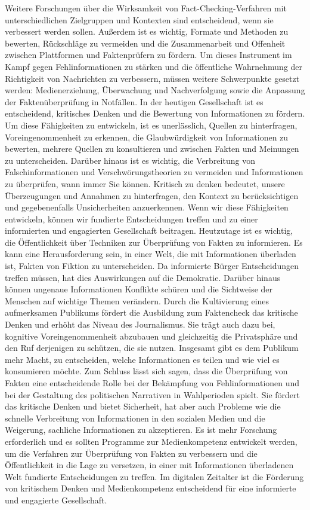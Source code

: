 \documentclass[a4paper,listof=totoc,bibliography=totoc]{scrartcl}
\begin{document}
Weitere Forschungen über die Wirksamkeit von Fact-Checking-Verfahren mit unterschiedlichen Zielgruppen und Kontexten sind entscheidend, wenn sie verbessert werden 
sollen. Außerdem ist es wichtig, Formate und Methoden zu bewerten, Rückschläge zu vermeiden und die Zusammenarbeit und Offenheit zwischen Plattformen und Faktenprüfern 
zu fördern. Um dieses Instrument im Kampf gegen Fehlinformationen zu stärken und die öffentliche Wahrnehmung der Richtigkeit von Nachrichten zu verbessern, müssen 
weitere Schwerpunkte gesetzt werden: Medienerziehung, Überwachung und Nachverfolgung sowie die Anpassung der Faktenüberprüfung in Notfällen. 
In der heutigen Gesellschaft ist es entscheidend, kritisches Denken und die Bewertung von Informationen zu fördern. Um diese Fähigkeiten zu entwickeln, ist es unerlässlich, 
Quellen zu hinterfragen, Voreingenommenheit zu erkennen, die Glaubwürdigkeit von Informationen zu bewerten, mehrere Quellen zu konsultieren und zwischen Fakten und 
Meinungen zu unterscheiden. Darüber hinaus ist es wichtig, die Verbreitung von Falschinformationen und Verschwörungstheorien zu vermeiden und Informationen zu überprüfen, 
wann immer Sie können. Kritisch zu denken bedeutet, unsere Überzeugungen und Annahmen zu hinterfragen, den Kontext zu berücksichtigen und gegebenenfalls Unsicherheiten 
anzuerkennen. Wenn wir diese Fähigkeiten entwickeln, können wir fundierte Entscheidungen treffen und zu einer informierten und engagierten Gesellschaft beitragen. 
Heutzutage ist es wichtig, die Öffentlichkeit über Techniken zur Überprüfung von Fakten zu informieren. Es kann eine Herausforderung sein, in einer Welt, die mit Informationen 
überladen ist, Fakten von Fiktion zu unterscheiden. Da informierte Bürger Entscheidungen treffen müssen, hat dies Auswirkungen auf die Demokratie. Darüber hinaus können 
ungenaue Informationen Konflikte schüren und die Sichtweise der Menschen auf wichtige Themen verändern. Durch die Kultivierung eines aufmerksamen Publikums fördert die Ausbildung 
zum Faktencheck das kritische Denken und erhöht das Niveau des Journalismus. Sie trägt auch dazu bei, kognitive Voreingenommenheit abzubauen und gleichzeitig die Privatsphäre 
und den Ruf derjenigen zu schützen, die sie nutzen. Insgesamt gibt es dem Publikum mehr Macht, zu entscheiden, welche Informationen es teilen und wie viel es konsumieren möchte. 
Zum Schluss lässt sich sagen, dass die Überprüfung von Fakten eine entscheidende Rolle bei der Bekämpfung von Fehlinformationen und bei der Gestaltung des politischen 
Narrativen in Wahlperioden spielt. Sie fördert das kritische Denken und bietet Sicherheit, hat aber auch Probleme wie die schnelle Verbreitung von Informationen in den 
sozialen Medien und die Weigerung, sachliche Informationen zu akzeptieren. Es ist mehr Forschung erforderlich und es sollten Programme zur Medienkompetenz entwickelt werden, 
um die Verfahren zur Überprüfung von Fakten zu verbessern und die Öffentlichkeit in die Lage zu versetzen, in einer mit Informationen überladenen Welt fundierte Entscheidungen 
zu treffen. Im digitalen Zeitalter ist die Förderung von kritischem Denken und Medienkompetenz entscheidend für eine informierte und engagierte Gesellschaft.

\newpage
{}

\end{document}
